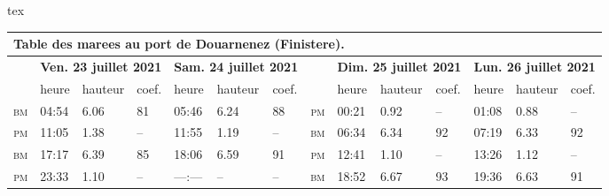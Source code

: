 \begin{codebox}{tex}
    \begin{table}[!htb]\small\sffamily
        \begin{tabularx}{\linewidth}{rXXXXXXrXXXXXX}
            \multicolumn{14}{l}{\textbf{Table des marees au port de Douarnenez (Finistere).}}                                                                                                                                                                                                                             \\
            \toprule
                        & \multicolumn{3}{c}{\textbf{Ven. 23 juillet 2021}} & \multicolumn{3}{c}{\textbf{Sam. 24 juillet 2021}} &       & \multicolumn{3}{c}{\textbf{Dim. 25 juillet 2021}} & \multicolumn{3}{c}{\textbf{Lun. 26 juillet 2021}}                                                                           \\
                        & heure                                             & hauteur                                           & coef. & heure                                             & hauteur                                           & coef. &             & heure & hauteur & coef. & heure & hauteur & coef. \\
            \cmidrule(lr){2-4}\cmidrule(lr){5-7}\cmidrule(lr){9-11}\cmidrule(lr){12-14}
            \textsc{bm} & 04:54                                             & 6.06                                              & 81    & 05:46                                             & 6.24                                              & 88    & \textsc{pm} & 00:21 & 0.92    & --    & 01:08 & 0.88    & --    \\
            \textsc{pm} & 11:05                                             & 1.38                                              & --    & 11:55                                             & 1.19                                              & --    & \textsc{bm} & 06:34 & 6.34    & 92    & 07:19 & 6.33    & 92    \\
            \textsc{bm} & 17:17                                             & 6.39                                              & 85    & 18:06                                             & 6.59                                              & 91    & \textsc{pm} & 12:41 & 1.10    & --    & 13:26 & 1.12    & --    \\
            \textsc{pm} & 23:33                                             & 1.10                                              & --    & ---:---                                           & --                                                & --    & \textsc{bm} & 18:52 & 6.67    & 93    & 19:36 & 6.63    & 91    \\
            \bottomrule
        \end{tabularx}
        \sidecaption{%
        }
    \end{table}\FloatBarrier
\end{codebox}

